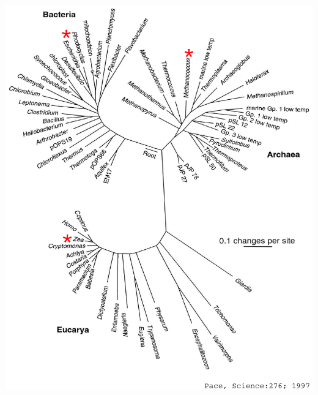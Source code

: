 \documentclass[landscape]{slides}
\begin{document}
\begin{slide}
\begin{minipage}{5.2in}
\vspace{2.5in}
\end{minipage}
\hspace{0.1in}
\begin{minipage}{5.5in}
\includegraphics[width=5.5in]{figs/bigtol}
\end{minipage}  

\end{slide}

\end{document}
